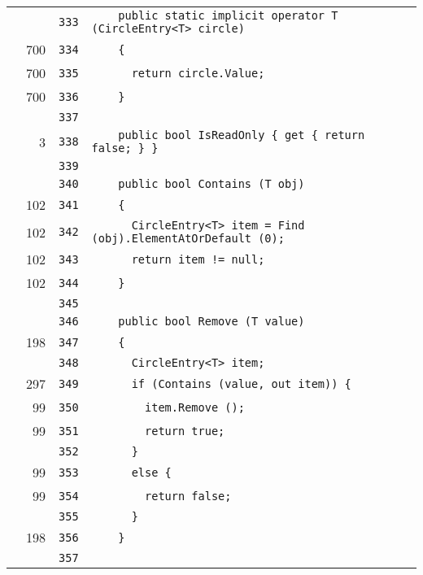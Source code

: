 \documentclass[a4paper,10pt]{article}
\begin{document}
\begin{longtable}[l]{lrrl}
\cellcolor{gray} &  & \verb~333~ & \verb~    public static implicit operator T (CircleEntry<T> circle)~\\
\cellcolor{green} & 700 & \verb~334~ & \verb~    {~\\
\cellcolor{green} & 700 & \verb~335~ & \verb~      return circle.Value;~\\
\cellcolor{green} & 700 & \verb~336~ & \verb~    }~\\
\cellcolor{gray} &  & \verb~337~ & \verb~~\\
\cellcolor{green} & 3 & \verb~338~ & \verb~    public bool IsReadOnly { get { return false; } }~\\
\cellcolor{gray} &  & \verb~339~ & \verb~~\\
\cellcolor{gray} &  & \verb~340~ & \verb~    public bool Contains (T obj)~\\
\cellcolor{green} & 102 & \verb~341~ & \verb~    {~\\
\cellcolor{green} & 102 & \verb~342~ & \verb~      CircleEntry<T> item = Find (obj).ElementAtOrDefault (0);~\\
\cellcolor{green} & 102 & \verb~343~ & \verb~      return item != null;~\\
\cellcolor{green} & 102 & \verb~344~ & \verb~    }~\\
\cellcolor{gray} &  & \verb~345~ & \verb~~\\
\cellcolor{gray} &  & \verb~346~ & \verb~    public bool Remove (T value)~\\
\cellcolor{green} & 198 & \verb~347~ & \verb~    {~\\
\cellcolor{gray} &  & \verb~348~ & \verb~      CircleEntry<T> item;~\\
\cellcolor{green} & 297 & \verb~349~ & \verb~      if (Contains (value, out item)) {~\\
\cellcolor{green} & 99 & \verb~350~ & \verb~        item.Remove ();~\\
\cellcolor{green} & 99 & \verb~351~ & \verb~        return true;~\\
\cellcolor{gray} &  & \verb~352~ & \verb~      }~\\
\cellcolor{green} & 99 & \verb~353~ & \verb~      else {~\\
\cellcolor{green} & 99 & \verb~354~ & \verb~        return false;~\\
\cellcolor{gray} &  & \verb~355~ & \verb~      }~\\
\cellcolor{green} & 198 & \verb~356~ & \verb~    }~\\
\cellcolor{gray} &  & \verb~357~ & \verb~~\\

\end{longtable}
\end{document}
